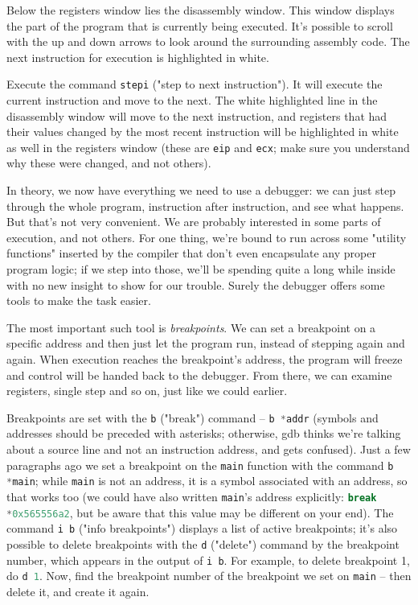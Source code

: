 \documentclass{article}
\newcommand{\xcode}[2]{\colorbox{ubuntuback}{\lstinline[language=#1]|#2|}}
\newcommand{\asm}[1]{\xcode{{[x86masm]assembler}}{#1}}
\newcommand{\code}[1]{\colorbox{ubuntuback}{\texttt{#1}}}
\newcommand{\gdb}[1]{\xcode{C}{#1}}
\begin{document}
Below the registers window lies the disassembly window. This window displays the part of the program that is currently being executed. It's possible to scroll with the up and down arrows to look around the surrounding assembly code. The next instruction for execution is highlighted in white.

Execute the command \xcode{C}{stepi} ("step to next instruction"). It will execute the current instruction and move to the next. The white highlighted line in the disassembly window will move to the next instruction, and registers that had their values changed by the most recent instruction will be highlighted in white as well in the registers window (these are \asm{eip} and \asm{ecx}; make sure you understand why these were changed, and not others).  

In theory, we now have everything we need to use a debugger: we can just step through the whole program, instruction after instruction, and see what happens. But that's not very convenient. We are probably interested in some parts of execution, and not others. For one thing, we're bound to run across some "utility functions" inserted by the compiler that don't even encapsulate any proper program logic; if we step into those, we'll be spending quite a long while inside with no new insight to show for our trouble. Surely the debugger offers some tools to make the task easier.

The most important such tool is \textit{breakpoints}. We can set a breakpoint on a specific address and then just let the program run, instead of stepping again and again. When execution reaches the breakpoint's address, the program will freeze and control will be handed back to the debugger. From there, we can examine registers, single step and so on, just like we could earlier.

Breakpoints are set with the \gdb{b} ("break") command -- \gdb{b *addr} (symbols and addresses should be preceded with asterisks; otherwise, gdb thinks we're talking about a source line and not an instruction address, and gets confused). Just a few paragraphs ago we set a breakpoint on the \code{main} function with the command \gdb{b *main}; while \gdb{main} is not an address, it is a symbol associated with an address, so that works too (we could have also written \gdb{main}'s address explicitly: \gdb{break *0x565556a2}, but be aware that this value may be different on your end).  The command \gdb{i b} ("info breakpoints") displays a list of active breakpoints; it's also possible to delete breakpoints with the \gdb{d} ("delete") command by the breakpoint number, which appears in the output of \gdb{i b}. For example, to delete breakpoint 1, do \gdb{d 1}. Now, find the breakpoint number of the breakpoint we set on \gdb{main} -- then delete it, and create it again.
\end{document}
